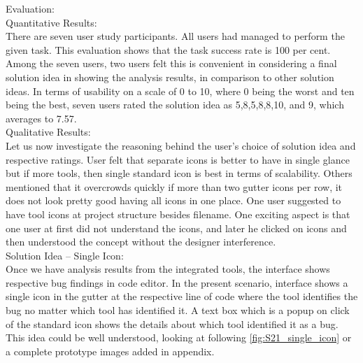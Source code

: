Evaluation: \\

Quantitative Results: \\

There are seven user study participants. All users had managed to perform the given task. This evaluation shows that the task success rate is 100 per cent. \\

Among the seven users, two users felt this is convenient in considering a final solution idea in showing the analysis results, in comparison to other solution ideas. In terms of usability on a scale of 0 to 10, where 0 being the worst and ten being the best, seven users rated the solution idea as 5,8,5,8,8,10, and 9, which averages to 7.57. \\

Qualitative Results: \\

Let us now investigate the reasoning behind the user’s choice of solution idea and respective ratings. User felt that separate icons is better to have in single glance but if more tools, then single standard icon is best in terms of scalability. Others mentioned that it overcrowds quickly if more than two gutter icons per row, it does not look pretty good having all icons in one place. One user suggested to have tool icons at project structure besides filename. One exciting aspect is that one user at first did not understand the icons, and later he clicked on icons and then understood the concept without the designer interference. \\

Solution Idea – Single Icon: \\

Once we have analysis results from the integrated tools, the interface shows respective bug findings in code editor. In the present scenario, interface shows a single icon in the gutter at the respective line of code where the tool identifies the bug no matter which tool has identified it. A text box which is a popup on click of the standard icon shows the details about which tool identified it as a bug. This idea could be well understood, looking at following \autoref{fig:S21_single_icon} or a complete prototype images added in appendix. \\

